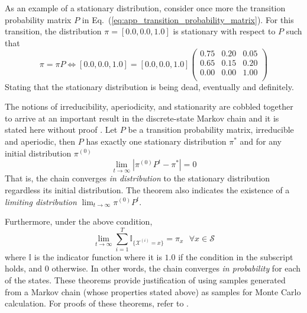 As an example of a stationary distribution, consider once more the transition probability matrix $P$ in Eq.~(\ref{eq:app_transition_probability_matrix}).
For this transition, the distribution $\pi = [0.0, 0.0, 1.0]$ is stationary with respect to $P$ such that
\begin{equation}
	\pi = \pi P \Leftrightarrow [0.0, 0.0, 1.0] = [0.0, 0.0, 1.0] 		\begin{pmatrix}
		  0.75  & 0.20 & 0.05\\
      0.65  & 0.15 & 0.20\\
      0.00  & 0.00 & 1.00\\
		\end{pmatrix}
\label{eq:app_markov_chain_stationary_example}
\end{equation}
Stating that the stationary distribution is being dead, eventually and definitely.

The notions of irreducibility, aperiodicity, and stationarity are cobbled together to arrive at an important result in the discrete-state Markov chain and it is stated here without proof \cite{Sargent2017}.
Let $P$ be a transition probability matrix, irreducible and aperiodic, then $P$ has exactly one stationary distribution $\pi^*$ and for any initial distribution $\pi^{(0)}$
\begin{equation}
	\lim_{t \rightarrow \infty} |\pi^{(0)}P^t - \pi^*| = 0
\label{eq:app_markov_chain_convergence}
\end{equation}
That is, the chain converges \emph{in distribution} to the stationary distribution regardless its initial distribution.
The theorem also indicates the existence of a \emph{limiting distribution} $\lim_{t \rightarrow \infty} \pi^{(0)}P^t$.

Furthermore, under the above condition,
\begin{equation}
	\lim_{t \rightarrow \infty} \sum_{i=1}^{T} \mathbb{I}_{\{\mathcal{X}^{(i)} = x\}} = \pi_{x} \,\,\,\, \forall x \in \mathcal{S}
\label{eq:app_markov_chain_ergodic_theorem}
\end{equation}
where $\mathbb{I}$ is the indicator function where it is $1.0$ if the condition in the subscript holds, and $0$ otherwise.
In other words, the chain converges \emph{in probability} for each of the states.
These theorems provide justification of using samples generated from a Markov chain (whose properties stated above) as samples for Monte Carlo calculation.
For proofs of these theorems, refer to \cite{Robert2004}.

